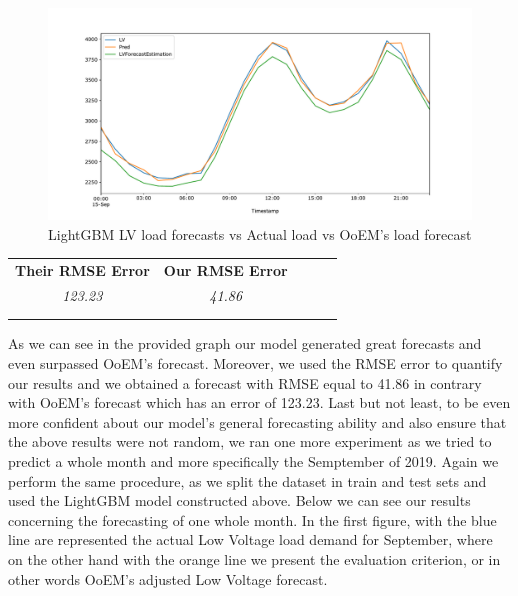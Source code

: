 \begin{figure}[ht!]
\centering
\includegraphics[width=1\linewidth]{project/final4.pdf}

\caption{LightGBM LV load forecasts vs Actual load vs OoEM’s load forecast}
\end{figure}
\begin{table}[ht!]
\centering
\begin{tabular}{lllll}
\cline{1-2}
\multicolumn{1}{|l|}{\textbf{Their RMSE Error}} & \multicolumn{1}{l|}{\textbf{Our RMSE Error}} &  &  &  \\ \cline{1-2}
\multicolumn{1}{|c|}{\textit{123.23}} & \multicolumn{1}{c|}{\textit{41.86}} &  &  &  \\ \cline{1-2}
                                &                                &  &  &  \\
                                &                                &  &  & 
\end{tabular}
\end{table}
\par As we can see in the provided graph our model generated great forecasts and even surpassed OoEM's forecast. Moreover, we used the RMSE error to quantify our results and we obtained a forecast with RMSE equal to 41.86 in contrary with OoEM's forecast which has an error of 123.23. Last but not least, to be even more confident about our model's general forecasting ability and also ensure that the above results were not random, we ran one more experiment as we tried to predict a whole month and more specifically the Semptember of 2019. Again we perform the same procedure, as we split the dataset in train and test sets and used the LightGBM model constructed above. Below we can see our results concerning the forecasting of one whole month. In the first figure, with the blue line are represented the actual Low Voltage load demand for September, where on the other hand with the orange line we present the evaluation criterion, or in other words OoEM's adjusted Low Voltage forecast.
